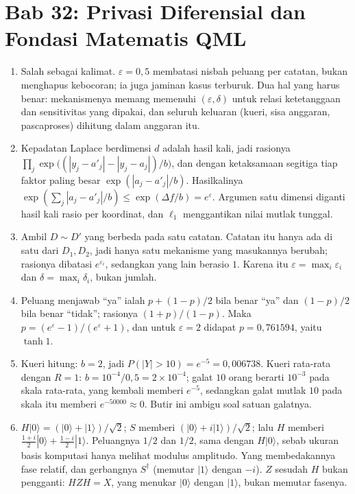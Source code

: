 \section*{Bab 32: Privasi Diferensial dan Fondasi Matematis QML}
\begin{enumerate}[label=\textbf{32.\arabic*}]
  \item Salah sebagai kalimat. $\varepsilon=0{,}5$ membatasi nisbah peluang per
        catatan, bukan menghapus kebocoran; ia juga jaminan kasus terburuk. Dua hal
        yang harus benar: mekanismenya memang memenuhi $(\varepsilon,\delta)$ untuk
        relasi ketetanggaan dan sensitivitas yang dipakai, dan seluruh keluaran
        (kueri, sisa anggaran, pascaproses) dihitung dalam anggaran itu.

  \item Kepadatan Laplace berdimensi $d$ adalah hasil kali, jadi rasionya
        $\prod_{j}\exp\bigl((|y_{j}-a'_{j}|-|y_{j}-a_{j}|)/b\bigr)$, dan dengan
        ketaksamaan segitiga tiap faktor paling besar
        $\exp(|a_{j}-a'_{j}|/b)$. Hasilkalinya
        $\exp(\sum_{j}|a_{j}-a'_{j}|/b)\le\exp(\Delta f/b)=e^{\varepsilon}$.
        Argumen satu dimensi diganti hasil kali rasio per koordinat, dan
        $\ell_1$ menggantikan nilai mutlak tunggal.

  \item Ambil $D\sim D'$ yang berbeda pada satu catatan. Catatan itu hanya ada di
        satu dari $D_{1},D_{2}$, jadi hanya satu mekanisme yang masukannya berubah;
        rasionya dibatasi $e^{\varepsilon_{i}}$, sedangkan yang lain berasio $1$.
        Karena itu $\varepsilon=\max_{i}\varepsilon_{i}$ dan
        $\delta=\max_{i}\delta_{i}$, bukan jumlah.

  \item Peluang menjawab ``ya'' ialah $p+(1-p)/2$ bila benar ``ya'' dan $(1-p)/2$
        bila benar ``tidak''; rasionya $(1+p)/(1-p)$. Maka
        $p=(e^{\varepsilon}-1)/(e^{\varepsilon}+1)$, dan untuk $\varepsilon=2$
        didapat $p=0{,}761594$, yaitu $\tanh1$.

  \item Kueri hitung: $b=2$, jadi $P(|Y|>10)=e^{-5}=0{,}006738$. Kueri rata-rata
        dengan $R=1$: $b=10^{-4}/0{,}5=2\times10^{-4}$; galat $10$ orang berarti
        $10^{-3}$ pada skala rata-rata, yang kembali memberi $e^{-5}$, sedangkan
        galat mutlak $10$ pada skala itu memberi $e^{-50000}\approx0$. Butir ini
        ambigu soal satuan galatnya.

  \item $H|0\rangle=(|0\rangle+|1\rangle)/\sqrt2$; $S$ memberi
        $(|0\rangle+i|1\rangle)/\sqrt2$; lalu $H$ memberi
        $\frac{1+i}{2}|0\rangle+\frac{1-i}{2}|1\rangle$. Peluangnya $1/2$ dan $1/2$,
        sama dengan $H|0\rangle$, sebab ukuran basis komputasi hanya melihat modulus
        amplitudo. Yang membedakannya fase relatif, dan gerbangnya $S^{\dagger}$
        (memutar $|1\rangle$ dengan $-i$). $Z$ sesudah $H$ bukan pengganti: $HZH=X$,
        yang menukar $|0\rangle$ dengan $|1\rangle$, bukan memutar fasenya.


\end{enumerate}
